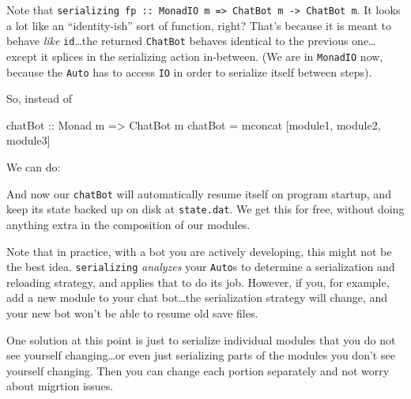 \documentclass[]{article}
\newenvironment{Shaded}{}{}
\newcommand{\DataTypeTok}[1]{\textcolor[rgb]{0.56,0.13,0.00}{{#1}}}
\newcommand{\StringTok}[1]{\textcolor[rgb]{0.25,0.44,0.63}{{#1}}}
\newcommand{\OtherTok}[1]{\textcolor[rgb]{0.00,0.44,0.13}{{#1}}}
\newcommand{\FunctionTok}[1]{\textcolor[rgb]{0.02,0.16,0.49}{{#1}}}
\newcommand{\NormalTok}[1]{{#1}}
\begin{document}
Note that
\texttt{serializing\textquotesingle{}\ fp\ ::\ MonadIO\ m\ =\textgreater{}\ ChatBot\ m\ -\textgreater{}\ ChatBot\ m}.
It looks a lot like an ``identity-ish'' sort of function, right? That's because
it is meant to behave \emph{like} \texttt{id}\ldots{}the returned
\texttt{ChatBot} behaves identical to the previous one\ldots{}except it splices
in the serializing action in-between. (We are in \texttt{MonadIO} now, because
the \texttt{Auto} has to access \texttt{IO} in order to serialize itself between
steps).

So, instead of

\begin{Shaded}
\begin{Highlighting}[]
\OtherTok{chatBot ::} \DataTypeTok{Monad} \NormalTok{m }\OtherTok{=>} \DataTypeTok{ChatBot} \NormalTok{m}
\NormalTok{chatBot }\FunctionTok{=} \NormalTok{mconcat [module1, module2, module3]}
\end{Highlighting}
\end{Shaded}

We can do:

\begin{Shaded}
\end{Shaded}

And now our \texttt{chatBot} will automatically resume itself on program
startup, and keep its state backed up on disk at \texttt{state.dat}. We get this
for free, without doing anything extra in the composition of our modules.

Note that in practice, with a bot you are actively developing, this might not be
the best idea. \texttt{serializing\textquotesingle{}} \emph{analyzes} your
\texttt{Auto}s to determine a serialization and reloading strategy, and applies
that to do its job. However, if you, for example, add a new module to your chat
bot\ldots{}the serialization strategy will change, and your new bot won't be
able to resume old save files.

One solution at this point is just to serialize individual modules that you do
not see yourself changing\ldots{}or even just serializing parts of the modules
you don't see yourself changing. Then you can change each portion separately and
not worry about migrtion issues.
\end{document}
